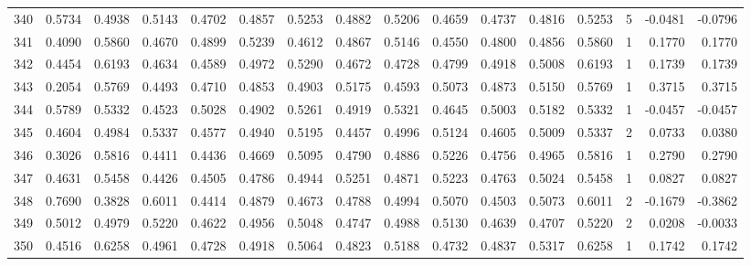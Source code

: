 \begin{tabular}{lrrrrrrrrrrrrrrr}
340 &      0.5734 &  0.4938 &  0.5143 &  0.4702 &  0.4857 &  0.5253 &  0.4882 &  0.5206 &  0.4659 &  0.4737 &   0.4816 &     0.5253 &      5 &                   -0.0481 &                    -0.0796 \\
341 &      0.4090 &  0.5860 &  0.4670 &  0.4899 &  0.5239 &  0.4612 &  0.4867 &  0.5146 &  0.4550 &  0.4800 &   0.4856 &     0.5860 &      1 &                    0.1770 &                     0.1770 \\
342 &      0.4454 &  0.6193 &  0.4634 &  0.4589 &  0.4972 &  0.5290 &  0.4672 &  0.4728 &  0.4799 &  0.4918 &   0.5008 &     0.6193 &      1 &                    0.1739 &                     0.1739 \\
343 &      0.2054 &  0.5769 &  0.4493 &  0.4710 &  0.4853 &  0.4903 &  0.5175 &  0.4593 &  0.5073 &  0.4873 &   0.5150 &     0.5769 &      1 &                    0.3715 &                     0.3715 \\
344 &      0.5789 &  0.5332 &  0.4523 &  0.5028 &  0.4902 &  0.5261 &  0.4919 &  0.5321 &  0.4645 &  0.5003 &   0.5182 &     0.5332 &      1 &                   -0.0457 &                    -0.0457 \\
345 &      0.4604 &  0.4984 &  0.5337 &  0.4577 &  0.4940 &  0.5195 &  0.4457 &  0.4996 &  0.5124 &  0.4605 &   0.5009 &     0.5337 &      2 &                    0.0733 &                     0.0380 \\
346 &      0.3026 &  0.5816 &  0.4411 &  0.4436 &  0.4669 &  0.5095 &  0.4790 &  0.4886 &  0.5226 &  0.4756 &   0.4965 &     0.5816 &      1 &                    0.2790 &                     0.2790 \\
347 &      0.4631 &  0.5458 &  0.4426 &  0.4505 &  0.4786 &  0.4944 &  0.5251 &  0.4871 &  0.5223 &  0.4763 &   0.5024 &     0.5458 &      1 &                    0.0827 &                     0.0827 \\
348 &      0.7690 &  0.3828 &  0.6011 &  0.4414 &  0.4879 &  0.4673 &  0.4788 &  0.4994 &  0.5070 &  0.4503 &   0.5073 &     0.6011 &      2 &                   -0.1679 &                    -0.3862 \\
349 &      0.5012 &  0.4979 &  0.5220 &  0.4622 &  0.4956 &  0.5048 &  0.4747 &  0.4988 &  0.5130 &  0.4639 &   0.4707 &     0.5220 &      2 &                    0.0208 &                    -0.0033 \\
350 &      0.4516 &  0.6258 &  0.4961 &  0.4728 &  0.4918 &  0.5064 &  0.4823 &  0.5188 &  0.4732 &  0.4837 &   0.5317 &     0.6258 &      1 &                    0.1742 &                     0.1742 \\

\end{tabular}
